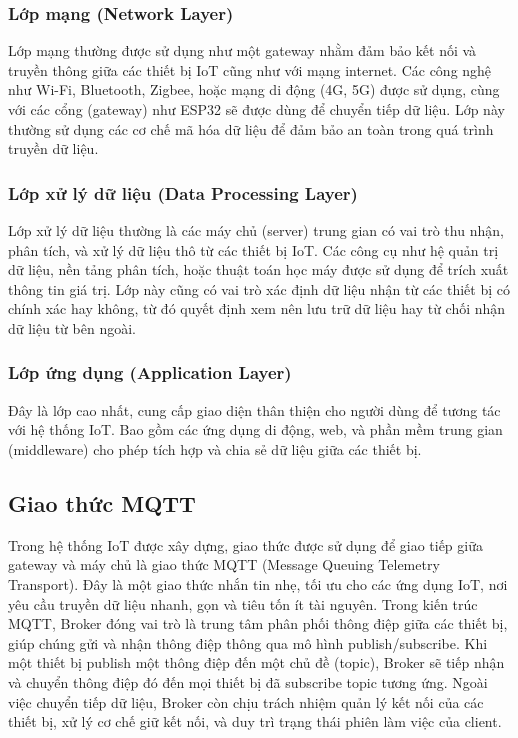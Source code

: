 \subsubsection{Lớp mạng (Network Layer)}
Lớp mạng thường được sử dụng như một gateway nhằm đảm bảo kết nối và truyền thông giữa các thiết bị IoT cũng như với mạng internet. Các công nghệ như Wi-Fi, Bluetooth, Zigbee, hoặc mạng di động (4G, 5G) được sử dụng, cùng với các cổng (gateway) như ESP32 sẽ được dùng để chuyển tiếp dữ liệu. Lớp này thường sử dụng các cơ chế mã hóa dữ liệu để đảm bảo an toàn trong quá trình truyền dữ liệu.
\subsubsection{Lớp xử lý dữ liệu (Data Processing Layer)}
Lớp xử lý dữ liệu thường là các máy chủ (server) trung gian có vai trò thu nhận, phân tích, và xử lý dữ liệu thô từ các thiết bị IoT. Các công cụ như hệ quản trị dữ liệu, nền tảng phân tích, hoặc thuật toán học máy được sử dụng để trích xuất thông tin giá trị. Lớp này cũng có vai trò xác định dữ liệu nhận từ các thiết bị có chính xác hay không, từ đó quyết định xem nên lưu trữ dữ liệu hay từ chối nhận dữ liệu từ bên ngoài.
\subsubsection{Lớp ứng dụng (Application Layer)}
Đây là lớp cao nhất, cung cấp giao diện thân thiện cho người dùng để tương tác với hệ thống IoT. Bao gồm các ứng dụng di động, web, và phần mềm trung gian (middleware) cho phép tích hợp và chia sẻ dữ liệu giữa các thiết bị.

\subsection{Giao thức MQTT}
Trong hệ thống IoT được xây dựng, giao thức được sử dụng để giao tiếp giữa gateway và máy chủ là giao thức MQTT (Message Queuing Telemetry Transport). Đây là một giao thức nhắn tin nhẹ, tối ưu cho các ứng dụng IoT, nơi yêu cầu truyền dữ liệu nhanh, gọn và tiêu tốn ít tài nguyên. Trong kiến trúc MQTT, Broker đóng vai trò là trung tâm phân phối thông điệp giữa các thiết bị, giúp chúng gửi và nhận thông điệp thông qua mô hình publish/subscribe. Khi một thiết bị publish một thông điệp đến một chủ đề (topic), Broker sẽ tiếp nhận và chuyển thông điệp đó đến mọi thiết bị đã subscribe topic tương ứng. Ngoài việc chuyển tiếp dữ liệu, Broker còn chịu trách nhiệm quản lý kết nối của các thiết bị, xử lý cơ chế giữ kết nối, và duy trì trạng thái phiên làm việc của client. 

